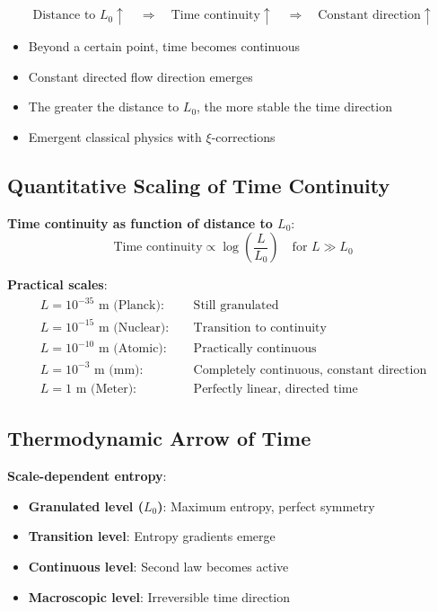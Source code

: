 \documentclass[12pt,a4paper]{article}
\newcommand{\xipar}{\xi}
\newcommand{\Lzero}{L_0}
\theoremstyle{definition}
\theoremstyle{remark}
\begin{document}
	\begin{tcolorbox}[colback=blue!5!white,colframe=blue!75!black,title=Central Insight]
		\begin{equation}
			\text{Distance to } \Lzero \uparrow \quad \Rightarrow \quad \text{Time continuity} \uparrow \quad \Rightarrow \quad \text{Constant direction} \uparrow
		\end{equation}
	\end{tcolorbox}
	
	\begin{itemize}
		\item Beyond a certain point, time becomes continuous
		\item Constant directed flow direction emerges
		\item The greater the distance to $\Lzero$, the more stable the time direction
		\item Emergent classical physics with $\xipar$-corrections
	\end{itemize}
	
	\subsection{Quantitative Scaling of Time Continuity}
	
	\textbf{Time continuity as function of distance to $\Lzero$}:
	\begin{equation}
		\text{Time continuity} \propto \log\left(\frac{L}{\Lzero}\right) \quad \text{for } L \gg \Lzero
	\end{equation}
	
	\textbf{Practical scales}:
	\begin{align}
		L = 10^{-35}\text{ m (Planck)}: &\quad \text{Still granulated} \\
		L = 10^{-15}\text{ m (Nuclear)}: &\quad \text{Transition to continuity} \\
		L = 10^{-10}\text{ m (Atomic)}: &\quad \text{Practically continuous} \\
		L = 10^{-3}\text{ m (mm)}: &\quad \text{Completely continuous, constant direction} \\
		L = 1\text{ m (Meter)}: &\quad \text{Perfectly linear, directed time}
	\end{align}
	
	\subsection{Thermodynamic Arrow of Time}
	
	\textbf{Scale-dependent entropy}:
	\begin{itemize}
		\item \textbf{Granulated level ($\Lzero$)}: Maximum entropy, perfect symmetry
		\item \textbf{Transition level}: Entropy gradients emerge
		\item \textbf{Continuous level}: Second law becomes active
		\item \textbf{Macroscopic level}: Irreversible time direction
	\end{itemize}
	
\end{document}
